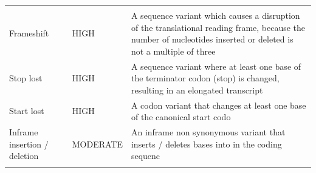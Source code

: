 \documentclass[12pt,a4paper,twoside]{ugathesis}
\theoremstyle{definition}
\theoremstyle{definition}
\theoremstyle{definition}
\theoremstyle{remark}
\begin{document}
\begin{longtable}[]{@{}lll@{}}
\begin{minipage}[t]{0.62\columnwidth}
\end{minipage}\tabularnewline
\begin{minipage}[t]{0.17\columnwidth}\raggedright\strut
Frameshift\strut
\end{minipage} & \begin{minipage}[t]{0.13\columnwidth}\raggedright\strut
HIGH\strut
\end{minipage} & \begin{minipage}[t]{0.62\columnwidth}\raggedright\strut
A sequence variant which causes a disruption of the translational
reading frame, because the number of nucleotides inserted or deleted is
not a multiple of three\strut
\end{minipage}\tabularnewline
\begin{minipage}[t]{0.17\columnwidth}\raggedright\strut
Stop lost\strut
\end{minipage} & \begin{minipage}[t]{0.13\columnwidth}\raggedright\strut
HIGH\strut
\end{minipage} & \begin{minipage}[t]{0.62\columnwidth}\raggedright\strut
A sequence variant where at least one base of the terminator codon
(stop) is changed, resulting in an elongated transcript\strut
\end{minipage}\tabularnewline
\begin{minipage}[t]{0.17\columnwidth}\raggedright\strut
Start lost\strut
\end{minipage} & \begin{minipage}[t]{0.13\columnwidth}\raggedright\strut
HIGH\strut
\end{minipage} & \begin{minipage}[t]{0.62\columnwidth}\raggedright\strut
A codon variant that changes at least one base of the canonical start
codo\strut
\end{minipage}\tabularnewline
\begin{minipage}[t]{0.17\columnwidth}\raggedright\strut
Inframe insertion / deletion\strut
\end{minipage} & \begin{minipage}[t]{0.13\columnwidth}\raggedright\strut
MODERATE\strut
\end{minipage} & \begin{minipage}[t]{0.62\columnwidth}\raggedright\strut
An inframe non synonymous variant that inserts / deletes bases into in
the coding sequenc\strut
\end{minipage}\tabularnewline
\begin{minipage}[t]{0.17\columnwidth}\raggedright\strut

\end{minipage}
\end{longtable}
\end{document}
